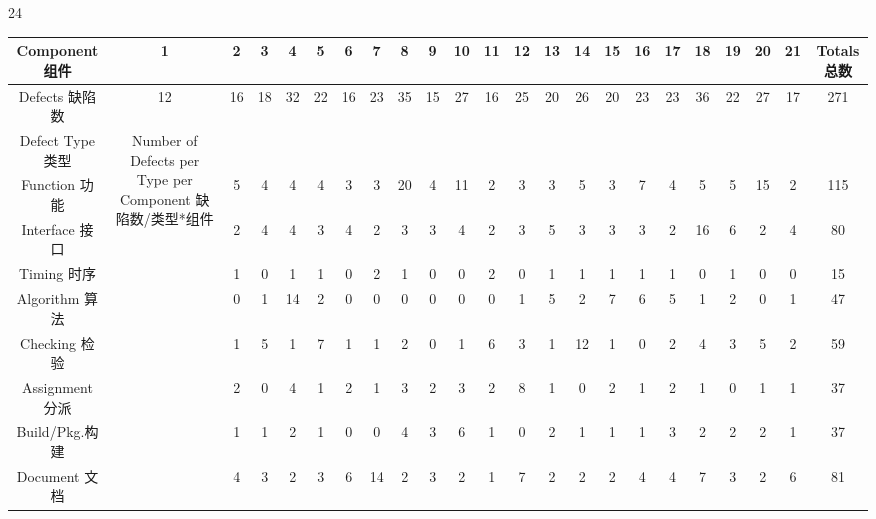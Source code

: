 \documentclass{book}        %
\begin{document}
24

\begin{tabular}{|c|c|c|c|c|c|c|c|c|c|c|c|c|c|c|c|c|c|c|c|c|c|c|}
\hline
Component 组件&1&2&3&4&5&6&7&8&9&10&11&12&13&14&15&16&17&18&19&20&21&Totals 总数\\
\hline
Defects 缺陷数&12&16&18&32&22&16&23&35&15&27&16&25&20&26&20&23&23&36&22&27&17&271\\
\hline
Defect Type 类型&\multirow{21}{*}{Number of Defects per Type per Component 缺陷数/类型*组件}&\:\\
\hline
Function 功能&3&5&4&4&4&3&3&20&4&11&2&3&3&5&3&7&4&5&5&15&2&115\\
\hline
Interface 接口&2&2&4&4&3&4&2&3&3&4&2&3&5&3&3&3&2&16&6&2&4&80\\
\hline
Timing 时序&1&1&0&1&1&0&2&1&0&0&2&0&1&1&1&1&1&0&1&0&0&15\\
\hline
Algorithm 算法&0&0&1&14&2&0&0&0&0&0&0&1&5&2&7&6&5&1&2&0&1&47\\
\hline
Checking 检验&1&1&5&1&7&1&1&2&0&1&6&3&1&12&1&0&2&4&3&5&2&59\\
\hline
Assignment 分派&0&2&0&4&1&2&1&3&2&3&2&8&1&0&2&1&2&1&0&1&1&37\\
\hline
Build/Pkg.构建&3&1&1&2&1&0&0&4&3&6&1&0&2&1&1&1&3&2&2&2&1&37\\
\hline
Document 文档&2&4&3&2&3&6&14&2&3&2&1&7&2&2&2&4&4&7&3&2&6&81\\
\hline
\end{tabular}
\end{document}
